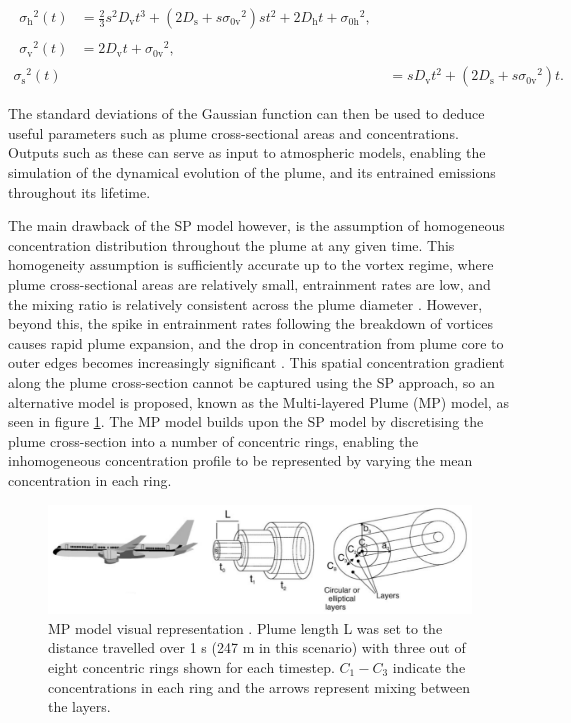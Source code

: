 \begin{align}
\begin{split}
	{\sigma_{\mathrm{h}}}^{2}(t) {}&= \frac{2}{3} s^2 D_{\mathrm{v}} t^3 + (2 D_{\mathrm{s}} + s {\sigma_{\mathrm{0v}}}^2) s t^2 + 2 D_{\mathrm{h}} t + {\sigma_{\mathrm{0h}}}^2,
\end{split} \\
\begin{split}
	{\sigma_{\mathrm{v}}}^{2}(t) {}&= 2 D_{\mathrm{v}} t + {\sigma_{\mathrm{0v}}}^2,
	\end{split}\\
	{\sigma_{\mathrm{s}}}^{2}(t) {}&= s D_{\mathrm{v}} t^2 + (2 D_{\mathrm{s}} + s {\sigma_{\mathrm{0v}}}^2) t.
\end{align}

The standard deviations of the Gaussian function can then be used to deduce useful parameters such as plume cross-sectional areas and concentrations. Outputs such as these can serve as input to atmospheric models, enabling the simulation of the dynamical evolution of the plume, and its entrained emissions throughout its lifetime. 

The main drawback of the SP model however, is the assumption of homogeneous concentration distribution throughout the plume at any given time. This homogeneity assumption is sufficiently accurate up to the vortex regime, where plume cross-sectional areas are relatively small, entrainment rates are low, and the mixing ratio is relatively consistent across the plume diameter \cite{Fritz2020}. However, beyond this, the spike in entrainment rates following the breakdown of vortices causes rapid plume expansion, and the drop in concentration from plume core to outer edges becomes increasingly significant \cite{Meijer2001, Melo1978}. This spatial concentration gradient along the plume cross-section cannot be captured using the SP approach, so an alternative model is proposed, known as the Multi-layered Plume (MP) model, as seen in figure \ref{MP_model}. The MP model builds upon the SP model by discretising the plume cross-section into a number of concentric rings, enabling the inhomogeneous concentration profile to be represented by varying the mean concentration in each ring.

\begin{figure}[H]
 \centering
 \includegraphics[width=0.9\linewidth]{MP_model.png}
 \caption{MP model visual representation \cite{Kraabol2000a}. Plume length L was set to the distance travelled over 1 s (247 m in this scenario) with three out of eight concentric rings shown for each timestep. $C_1 - C_3$ indicate the concentrations in each ring and the arrows represent mixing between the layers.}
 \label{MP_model}
 \end{figure}

